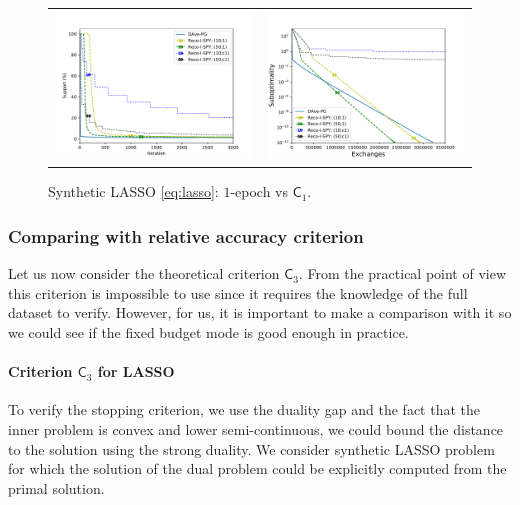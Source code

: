 \begin{figure}[b!]
\begin{tabular}{cc}
\includegraphics[width = 0.49\linewidth]{spy/figs/lasso_5w_1000_10000_density_criteria_1.pdf}&
\includegraphics[width = 0.49\linewidth]{spy/figs/lasso_5w_1000_10000_fun_vs_ex_log_criteria_1.pdf}\\%
\end{tabular}
\caption{Synthetic LASSO \eqref{eq:lasso}: $1$-epoch vs $\mathsf{C}_1$.}
\label{fig:fix_budget_variants_c1}
\end{figure}


\subsubsection{Comparing with relative accuracy criterion}
Let us now consider the theoretical criterion $\mathsf{C}_3$. From the practical point of view this criterion is impossible to use since it requires the knowledge of the full dataset to verify. However, for us, it is important to make a comparison with it so we could see if the fixed budget mode is good enough in practice.

\paragraph{Criterion $\mathsf{C}_3$ for LASSO}

To verify the stopping criterion, we use the duality gap and the fact that the inner problem is convex and lower semi-continuous, we could bound the distance to the solution using the strong duality. We consider synthetic LASSO problem for which the solution of the dual problem could be explicitly computed from the primal solution.

